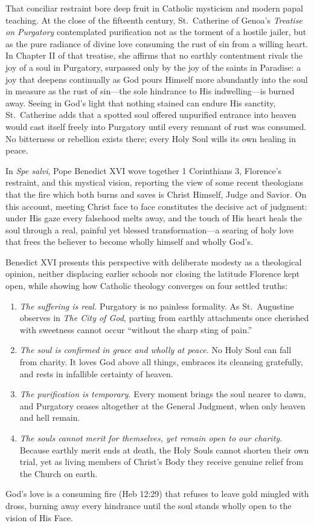 That conciliar restraint bore deep fruit in Catholic mysticism and modern papal teaching. At the close of the fifteenth century, St.\ Catherine of Genoa's \textit{Treatise on Purgatory} contemplated purification not as the torment of a hostile jailer, but as the pure radiance of divine love consuming the rust of sin from a willing heart. In Chapter II of that treatise, she affirms that no earthly contentment rivals the joy of a soul in Purgatory, surpassed only by the joy of the saints in Paradise: a joy that deepens continually as God pours Himself more abundantly into the soul in measure as the rust of sin---the sole hindrance to His indwelling---is burned away. Seeing in God's light that nothing stained can endure His sanctity, St.\ Catherine adds that a spotted soul offered unpurified entrance into heaven would cast itself freely into Purgatory until every remnant of rust was consumed. No bitterness or rebellion exists there; every Holy Soul wills its own healing in peace.

In \textit{Spe salvi}, Pope Benedict XVI wove together 1 Corinthians 3, Florence's restraint, and this mystical vision, reporting the view of some recent theologians that the fire which both burns and saves is Christ Himself, Judge and Savior. On this account, meeting Christ face to face constitutes the decisive act of judgment: under His gaze every falsehood melts away, and the touch of His heart heals the soul through a real, painful yet blessed transformation---a searing of holy love that frees the believer to become wholly himself and wholly God's.

Benedict XVI presents this perspective with deliberate modesty as a theological opinion, neither displacing earlier schools nor closing the latitude Florence kept open, while showing how Catholic theology converges on four settled truths:

\begin{enumerate}
\item \textit{The suffering is real.} Purgatory is no painless formality. As St.\ Augustine observes in \textit{The City of God}, parting from earthly attachments once cherished with sweetness cannot occur ``without the sharp sting of pain.''
\item \textit{The soul is confirmed in grace and wholly at peace.} No Holy Soul can fall from charity. It loves God above all things, embraces its cleansing gratefully, and rests in infallible certainty of heaven.
\item \textit{The purification is temporary.} Every moment brings the soul nearer to dawn, and Purgatory ceases altogether at the General Judgment, when only heaven and hell remain.
\item \textit{The souls cannot merit for themselves, yet remain open to our charity.} Because earthly merit ends at death, the Holy Souls cannot shorten their own trial, yet as living members of Christ's Body they receive genuine relief from the Church on earth.
\end{enumerate}

God's love is a consuming fire (Heb 12:29) that refuses to leave gold mingled with dross, burning away every hindrance until the soul stands wholly open to the vision of His Face.
